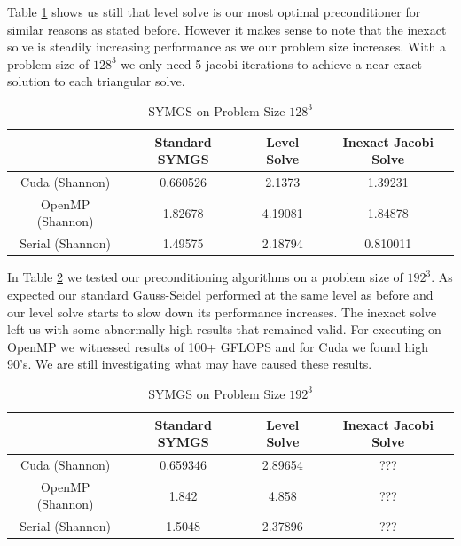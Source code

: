 \documentclass{ccr15}
\begin{document}
Table \ref{SYMGS128} shows us still that level solve is our most optimal preconditioner for
similar reasons as stated before. However it makes sense to note that the inexact solve is
steadily increasing performance as we our problem size increases. With a problem size of $128^3$
we only need 5 jacobi iterations to achieve a near exact solution to each triangular solve.

\begin{table}[h]
\begin{center}
\begin{tabular}{|c||c|c|c|}
\hline
& Standard SYMGS & Level Solve & Inexact Jacobi Solve \\
\hline \hline
Cuda (Shannon) & 0.660526 & 2.1373 & 1.39231 \\
\hline
OpenMP (Shannon) & 1.82678 & 4.19081 & 1.84878 \\
\hline
Serial (Shannon) & 1.49575 & 2.18794 & 0.810011 \\
\hline
\end{tabular}
\caption{SYMGS on Problem Size $128^3$}
\label{SYMGS128}
\end{center}
\end{table}

In Table \ref{SYMGS192} we tested our preconditioning algorithms on a problem size of $192^3$. As
expected our standard Gauss-Seidel performed at the same level as before and our level solve
starts to slow down its performance increases. The inexact solve left us with some abnormally
high results that remained valid. For executing on OpenMP we witnessed results of 100+ GFLOPS
and for Cuda we found high 90's. We are still investigating what may have caused these results.

\begin{table}[h]
\begin{center}
\begin{tabular}{|c||c|c|c|}
\hline
& Standard SYMGS & Level Solve & Inexact Jacobi Solve \\
\hline \hline
Cuda (Shannon) & 0.659346 & 2.89654 & ??? \\
\hline
OpenMP (Shannon) & 1.842 & 4.858 & ??? \\
\hline
Serial (Shannon) & 1.5048 & 2.37896 & ??? \\
\hline
\end{tabular}
\caption{SYMGS on Problem Size $192^3$}
\label{SYMGS192}
\end{center}
\end{table}
\end{document}
